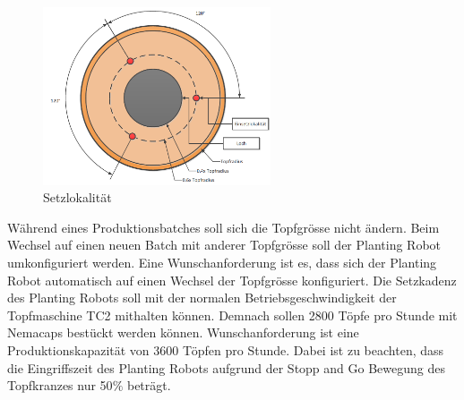 \begin{figure}[H]
	\includegraphics[width=0.6\textwidth]{Illustrationen/4-Entwurf/Setzprozess.png}
	\caption{Setzlokalität}
	\label{fig:Setzprozess}
\end{figure}

Während eines Produktionsbatches soll sich die Topfgrösse nicht ändern. Beim Wechsel auf einen neuen Batch mit anderer Topfgrösse soll der Planting Robot umkonfiguriert werden. Eine Wunschanforderung ist es, dass sich der Planting Robot automatisch auf einen Wechsel der Topfgrösse konfiguriert. Die Setzkadenz des Planting Robots soll mit der normalen Betriebsgeschwindigkeit der Topfmaschine TC2 mithalten können. Demnach sollen 2800 Töpfe pro Stunde mit Nemacaps bestückt werden können. Wunschanforderung ist eine Produktionskapazität von 3600 Töpfen pro Stunde. Dabei ist zu beachten, dass die Eingriffszeit des Planting Robots aufgrund der Stopp and Go Bewegung des Topfkranzes nur 50$\%$ beträgt.